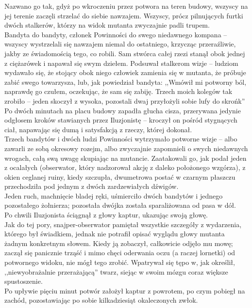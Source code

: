 \documentclass[../MAIN.tex]{subfiles}
\begin{document}
Nazwano go tak, gdyż po wkroczeniu przez potwora na teren budowy, wszyscy na jej terenie zaczęli strzelać do siebie nawzajem. Wszyscy, prócz pilnujących furtki dwóch stalkerów, którzy na widok mutanta zwyczajnie padli trupem.\\
Bandyta do bandyty, członek Powinności do swego niedawnego kompana -- wszyscy wystrzelali się nawzajem niemal do ostatniego, krzycząc przeraźliwie, jakby ze świadomością tego, co robili. Sam stwórca całej rzezi stanął obok jednej z ciężarówek i napawał się swym dziełem. Podsuwał stalkerom wizje -- ludziom wydawało się, że stojący obok niego człowiek zamienia się w mutanta, że próbuje zabić swego towarzysza, lub, jak powiedział bandyta: ,,Wmówił mi potworny ból, naprawdę go czułem, oczekując, że sam się zabiję. Trzech moich kolegów tak zrobiło -- jeden skoczył z wysoka, pozostali dwaj przyłożyli sobie lufy do skroń\3k''\\
Po dwóch minutach na placu budowy zapadła głucha cisza, przerywana jedynie odgłosem kroków stawianych przez Iluzjonistę -- kroczył on pośród stygnących ciał, napawając się dumą i satysfakcją z rzeczy, której dokonał.\\
Trzech bandytów i dwóch ludzi Powinności wytrzymało potworne wizje -- albo zawarli ze sobą okresowy rozejm, albo zwyczajnie zapomnieli o swych niedawnych wrogach, całą swą uwagę skupiając na mutancie. Zaatakowali go, jak podał jeden z ocalałych (obserwator, który nadzorował akcję z daleko położonego wzgórza), z okien ceglanej ruiny, kiedy szczupła, dwumetrowa postać w czarnym płaszczu przechodziła pod jednym z dwóch zardzewiałych dźwigów.\\
Jeden ruch, machnięcie bladej ręki, uśmierciło dwóch bandytów i jednego pozostałego żołnierza; pozostała dwójka została sparaliżowana od pasa w dół.\\
Po chwili Iluzjonista ściągnął z głowy kaptur, ukazując swoją głowę.\\
Jak do tej pory, snajper-obserwator pamiętał wszystkie szczegóły z wydarzenia, którego był świadkiem, jednak nie potrafił opisać wyglądu głowy mutanta żadnym konkretnym słowem. Kiedy ją zobaczył, całkowicie odjęło mu mowę; zaczął się panicznie trząść i mimo chęci oderwania oczu (a raczej lornetki) od potwornego widoku, nie mógł tego zrobić. Wpatrywał się tępo w, jak określił, ,,niewyobrażalnie przerażającą'' twarz, siejąc w swoim mózgu coraz większe spustoszenie.\\
Po upływie pięciu minut potwór założył kaptur z powrotem, po czym pobiegł na zachód, pozostawiając po sobie kilkadziesiąt okaleczonych zwłok.\\
\end{document}
